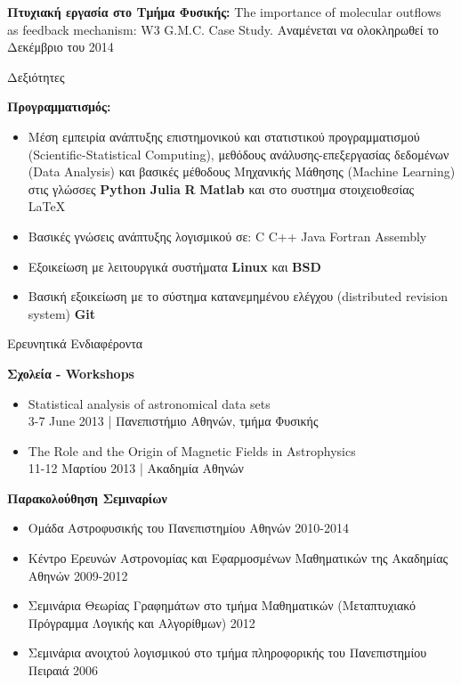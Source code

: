 \documentclass[a4paper,12pt,final]{memoir}
\newcommand{\SmallSep}{\vspace{0.4em}}
\newcommand{\CVSection}[1]
	{\Large{#1}\par
	\SmallSep\normalsize\normalfont}
\newcommand{\CVItem}[2]
	{\textbf{\color{RoyalBlue} #1} #2}
\newcommand{\location}[1]{ %
\small{\color{headings}#1}}
\newenvironment{tightitemize} %
{\vspace{-\topsep}\begin{itemize}\itemsep1pt \parskip0pt \parsep0pt}
{\end{itemize}\vspace{-\topsep}}
\begin{document}
\CVItem{Πτυχιακή εργασία στο Τμήμα Φυσικής:}{The importance of molecular outflows as feedback mechanism: W3 G.M.C. Case Study. \newline}
\location{Αναμένεται να ολοκληρωθεί το Δεκέμβριο του 2014}
\SmallSep


\CVSection{Δεξιότητες}
\CVItem{Προγραμματισμός:}{}
\begin{tightitemize}
\item Μέση εμπειρία ανάπτυξης επιστημονικού και στατιστικού προγραμματισμού (Scientific-Statistical Computing), μεθόδους ανάλυσης-επεξεργασίας δεδομένων (Data Analysis) και βασικές μέθοδους Μηχανικής Μάθησης (Machine Learning) στις γλώσσες \textbf{Python}  \textbullet{} \textbf{Julia} \textbullet{} \textbf{R} \textbullet{} \textbf{Matlab} και στο συστημα στοιχειοθεσίας  \LaTeX\ 
\item Βασικές γνώσεις ανάπτυξης λογισμικού σε: C \textbullet{} C++ \textbullet{} Java \textbullet{} Fortran \textbullet{} Assembly 
\item Εξοικείωση με λειτουργικά συστήματα \textbf{Linux} και \textbf{BSD}
\item Βασική εξοικείωση με το σύστημα κατανεμημένου ελέγχου (distributed revision system) \textbf{Git}
\end{tightitemize}
\SmallSep

\CVSection{Ερευνητικά Ενδιαφέροντα}
\CVItem{Σχολεία - Workshops}{}
\begin{tightitemize}
\item Statistical analysis of astronomical data sets \\
\location{3-7 June 2013 | Πανεπιστήμιο Αθηνών, τμήμα Φυσικής}
\item The Role and the Origin of Magnetic Fields in Astrophysics \\
\location{11-12 Μαρτίου 2013 | Ακαδημία Αθηνών}
\end{tightitemize}
\SmallSep

\CVItem{Παρακολούθηση Σεμιναρίων}{}
\begin{tightitemize}
\item Ομάδα Αστροφυσικής του Πανεπιστημίου Αθηνών \location{2010-2014}
\item Κέντρο Ερευνών Αστρονομίας και Εφαρμοσμένων Μαθηματικών της Ακαδημίας Αθηνών \location{2009-2012}
\item Σεμινάρια Θεωρίας Γραφημάτων στο τμήμα Μαθηματικών (Μεταπτυχιακό Πρόγραμμα Λογικής και Αλγορίθμων) \location{2012}
\item Σεμινάρια ανοιχτού λογισμικού στο τμήμα πληροφορικής του Πανεπιστημίου Πειραιά \location{2006}
\end{tightitemize}
\SmallSep
\end{document}
